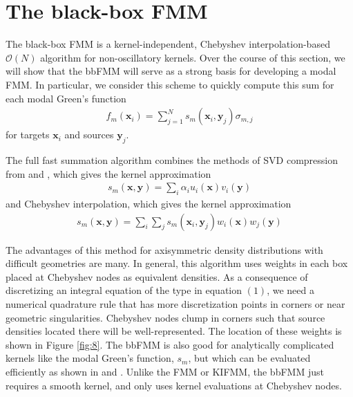 \documentclass[11pt, oneside]{article}   	%
\begin{document}
\section{The black-box FMM}
The black-box FMM is a kernel-independent, Chebyshev interpolation-based $\mathcal{O}(N)$ algorithm for non-oscillatory kernels. Over the course of this section, we will show that the bbFMM will serve as a strong basis for developing a modal FMM. In particular, we consider this scheme to quickly compute this sum for each modal Green's function
\begin{align}
f_m(\mathbf{x}_i)=\sum_{j=1}^N s_m(\mathbf{x}_i,\mathbf{y}_j)\sigma_{m,j}
\end{align}
for targets $\mathbf{x}_i$ and sources $\mathbf{y}_j$.

The full fast summation algorithm combines the methods of SVD compression from \cite{ZGR} and \cite{MR}, which gives the kernel approximation
\begin{align}
s_m(\mathbf{x},\mathbf{y})=\sum_i \alpha_i u_i(\mathbf{x})v_i(\mathbf{y})
\end{align}
and Chebyshev interpolation, which gives the kernel approximation
\begin{align}
s_m(\mathbf{x},\mathbf{y})=\sum_i\sum_j s_m(\mathbf{x}_i,\mathbf{y}_j)w_i(\mathbf{x})w_j(\mathbf{y})
\end{align}

The advantages of this method for axisymmetric density distributions with difficult geometries are many. In general, this algorithm uses weights in each box placed at Chebyshev nodes as equivalent densities. As a consequence of discretizing an integral equation of the type in equation $(1)$, we need a numerical quadrature rule that has more discretization points in corners or near geometric singularities. Chebyshev nodes clump in corners such that source densities located there will be well-represented. The location of these weights is shown in Figure \ref{fig:8}. The bbFMM is also good for analytically complicated kernels like the modal Green's function, $s_m$, but which can be evaluated efficiently as shown in \cite{HK} and \cite{YYM}. Unlike the FMM or KIFMM, the bbFMM just requires a smooth kernel, and only uses kernel evaluations at Chebyshev nodes.
\end{document}
